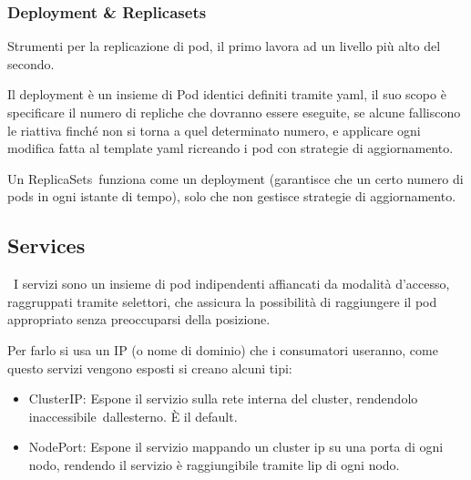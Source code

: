 \documentclass[
]{article}
\providecommand{\tightlist}{%
  \setlength{\itemsep}{0pt}\setlength{\parskip}{0pt}}
\begin{document}
\subsubsection{\texorpdfstring{{Deployment \&
Replicasets}}{Deployment \& Replicasets}}\label{h.x16bhexfu47a}

{Strumenti per la replicazione di pod, il primo lavora ad un livello più
alto del secondo.}

{}

{Il deployment è un insieme di Pod identici definiti tramite yaml, il
suo scopo è specificare il numero di repliche che dovranno essere
eseguite, se alcune falliscono le riattiva finché non si torna a quel
determinato numero, e applicare ogni modifica fatta al template yaml
ricreando i pod con strategie di aggiornamento.}

{}

{Un }{ReplicaSets}{~funziona come un deployment (garantisce che un certo
numero di pods in ogni istante di tempo), solo che non gestisce
strategie di aggiornamento.}

{}

\subsection{\texorpdfstring{{Services}}{Services}}\label{h.3pvs122m9h34}

{~I servizi sono un insieme di pod indipendenti affiancati da modalità
d'accesso, raggruppati tramite selettori, che assicura la possibilità di
raggiungere il pod appropriato senza preoccuparsi della posizione.}

{}

{Per farlo si usa un IP (o nome di dominio) che i consumatori useranno,
come questo servizi vengono esposti si creano alcuni tipi:}

\begin{itemize}
\tightlist
\item
  {ClusterIP}{: Espone il servizio sulla rete interna del cluster,
  }{rendendolo }{ina}{ccessibile}{~dall\textquotesingle esterno. È il
  default. }
\end{itemize}

{}

\begin{itemize}
\tightlist
\item
  {NodePort}{: Espone il servizio mappando un cluster ip su una porta di
  ogni nodo, rendendo il servizio è raggiungibile tramite
  l\textquotesingle ip di ogni nodo. }
\end{itemize}
\end{document}

